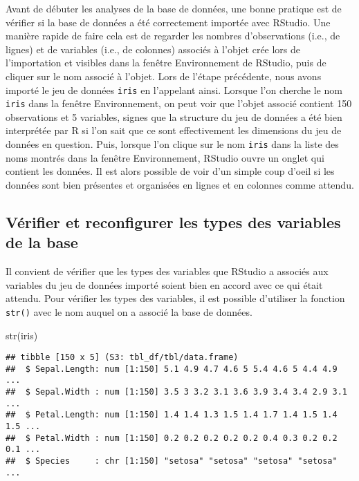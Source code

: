 \documentclass[
]{book}
\newenvironment{Shaded}{\begin{snugshade}}{\end{snugshade}}
\newcommand{\FunctionTok}[1]{\textcolor[rgb]{0.00,0.00,0.00}{#1}}
\newcommand{\NormalTok}[1]{#1}
\begin{document}
Avant de débuter les analyses de la base de données, une bonne pratique est de vérifier si la base de données a été correctement importée avec RStudio. Une manière rapide de faire cela est de regarder les nombres d'observations (i.e., de lignes) et de variables (i.e., de colonnes) associés à l'objet crée lors de l'importation et visibles dans la fenêtre Environnement de RStudio, puis de cliquer sur le nom associé à l'objet. Lors de l'étape précédente, nous avons importé le jeu de données \texttt{iris} en l'appelant ainsi. Lorsque l'on cherche le nom \texttt{iris} dans la fenêtre Environnement, on peut voir que l'objet associé contient 150 observations et 5 variables, signes que la structure du jeu de données a été bien interprétée par R si l'on sait que ce sont effectivement les dimensions du jeu de données en question. Puis, lorsque l'on clique sur le nom \texttt{iris} dans la liste des noms montrés dans la fenêtre Environnement, RStudio ouvre un onglet qui contient les données. Il est alors possible de voir d'un simple coup d'oeil si les données sont bien présentes et organisées en lignes et en colonnes comme attendu.

\hypertarget{vuxe9rifier-et-reconfigurer-les-types-des-variables-de-la-base}{%
\subsection{Vérifier et reconfigurer les types des variables de la base}\label{vuxe9rifier-et-reconfigurer-les-types-des-variables-de-la-base}}

Il convient de vérifier que les types des variables que RStudio a associés aux variables du jeu de données importé soient bien en accord avec ce qui était attendu. Pour vérifier les types des variables, il est possible d'utiliser la fonction \texttt{str()} avec le nom auquel on a associé la base de données.

\begin{Shaded}
\begin{Highlighting}[]
\FunctionTok{str}\NormalTok{(iris)}
\end{Highlighting}
\end{Shaded}

\begin{verbatim}
## tibble [150 x 5] (S3: tbl_df/tbl/data.frame)
##  $ Sepal.Length: num [1:150] 5.1 4.9 4.7 4.6 5 5.4 4.6 5 4.4 4.9 ...
##  $ Sepal.Width : num [1:150] 3.5 3 3.2 3.1 3.6 3.9 3.4 3.4 2.9 3.1 ...
##  $ Petal.Length: num [1:150] 1.4 1.4 1.3 1.5 1.4 1.7 1.4 1.5 1.4 1.5 ...
##  $ Petal.Width : num [1:150] 0.2 0.2 0.2 0.2 0.2 0.4 0.3 0.2 0.2 0.1 ...
##  $ Species     : chr [1:150] "setosa" "setosa" "setosa" "setosa" ...
\end{verbatim}
\end{document}
